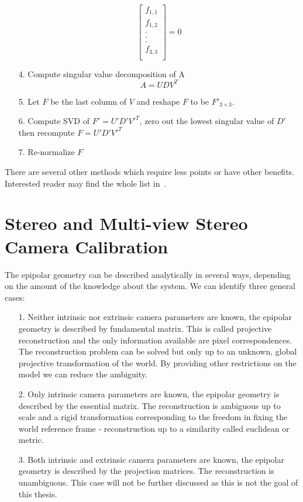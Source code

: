 \begin{itemize}
\begin{equation}
		\begin{bmatrix}
			f_{1,1} \\
			f_{1,2} \\
			. \\
			. \\
			. \\
			f_{3,3} \\
		\end{bmatrix}
		= 0
	\end{equation}
	\item[4.] Compute singular value decomposition of A
		\begin{equation}
			A = UDV^T
		\end{equation}
	\item[5.] Let $F$ be the last column of $V$ and reshape $F$ to be  $F'_{3 \times 3}$.
	\item[6.] Compute SVD of $F'=U'D'V'^T$, zero out the lowest singular value of $D'$ then recompute $F = U'D'V'^T$
	\item[7.] Re-normalize $F$
\end{itemize}
There are several other methods which require less points or have other benefits. Interested reader may find the whole list in~\cite{book:multiple_view_geometry}.

\section{Stereo and Multi-view Stereo Camera Calibration}
The epipolar geometry can be described analytically in several ways, depending on the amount of the knowledge about the system. We can identify three general cases:
\begin{itemize}
	\item[1.] Neither intrinsic nor extrinsic camera parameters are known, the epipolar geometry is described by fundamental matrix. This is called projective reconstruction and the only information available are pixel correspondences. The reconstruction problem can be solved but only up to an unknown, global projective transformation of the world.  By providing other restrictions on the model we can reduce the ambiguity.
	\item[2.] Only intrinsic camera parameters are known, the epipolar geometry is described by the essential matrix. The reconstruction is ambiguous up to scale and a rigid transformation corresponding to the freedom in fixing the world reference frame - reconstruction up to a similarity called euclidean or metric.
	\item[3.] Both intrinsic and extrinsic camera parameters are known, the epipolar geometry is described by the projection matrices. The reconstruction is unambiguous. This case will not be further discussed as this is not the goal of this thesis.
\end{itemize}


